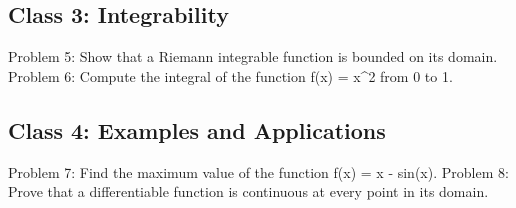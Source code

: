 \documentclass{article}
\begin{document}
\subsection*{Class 3: Integrability}
Problem 5: Show that a Riemann integrable function is bounded on its domain.
Problem 6: Compute the integral of the function f(x) = x^2 from 0 to 1.
\subsection*{Class 4: Examples and Applications}
Problem 7: Find the maximum value of the function f(x) = x - sin(x).
Problem 8: Prove that a differentiable function is continuous at every point in its 
domain.
\end{document}
